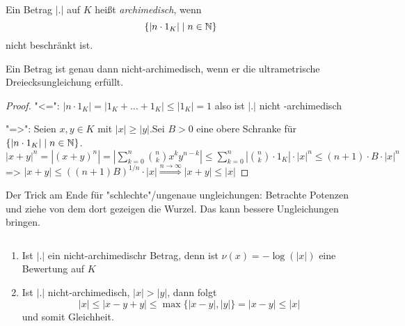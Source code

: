 \documentclass[../main.tex]{subfiles}
\begin{document}
\begin{definition}
    Ein Betrag $|.|$ auf $K$ heißt \emph{archimedisch}, wenn 
    $$\{|n\cdot1_K| \mid n\in \mathbb{N}\}$$
    nicht beschränkt ist.
\end{definition}

\begin{theorem}
    Ein Betrag ist genau dann nicht-archimedisch, wenn er die ultrametrische Dreiecksungleichung erfüllt.
\end{theorem}
\begin{proof}
    "<=":
    $|n\cdot 1_K|= |1_K+\dots+1_K| \leq |1_K| = 1$ also ist $|.|$ nicht -archimedisch

    "=>":
    Seien $x,y\in K$ mit $|x|\geq|y|$.Sei $B>0$ eine obere Schranke für $\{|n\cdot1_K| \mid n\in \mathbb{N}\}$.
    $|x+y|^n = |(x+y)^n| = |\sum_{k=0}^n \binom{n}{k} x^k y^{n-k}| \leq \sum_{k=0}^n |\binom{n}{k}\cdot 1_K| \cdot |x|^n\leq (n+1)\cdot B\cdot |x|^n$
    => $|x+y| \leq ((n+1)B)^{1/n} \cdot |x| \overset{n\rightarrow \infty}{\Rightarrow} |x+y| \leq |x|$
\end{proof}
Der Trick am Ende für "schlechte"/ungenaue ungleichungen:
Betrachte Potenzen und ziehe von dem dort gezeigen die Wurzel. Das kann bessere Ungleichungen bringen.
\begin{remark}$ $
    \begin{enumerate}[label=\alph*)]
        \item Ist $|.|$ ein nicht-archimedischr Betrag, denn ist $\nu(x) = -\log(|x|)$ eine Bewertung auf $K$
        \item Ist $|.|$ nicht-archimedisch, $|x|> |y|$, dann folgt 
        $$|x|\leq |x-y+y|\leq \max\{|x-y|,|y|\} = |x-y| \leq |x|$$
        und somit Gleichheit.
    \end{enumerate}
\end{remark}
\end{document}
